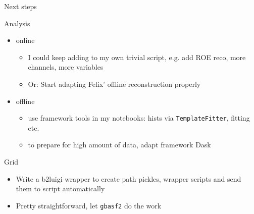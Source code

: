 \documentclass[aspectratio=169, 16pt]{beamer}
\begin{document}
\begin{frame}[label={sec:org5885a38},fragile]{Next steps}
 \begin{block}{Analysis}
\begin{itemize}
\item online
\begin{itemize}
\item I could keep adding to my own trivial script, e.g. add ROE reco, more
channels, more variables
\item Or: Start adapting Felix' offline reconstruction properly
\end{itemize}
\item offline
\begin{itemize}
\item use framework tools in my notebooks: hists via \texttt{TemplateFitter}, fitting etc.
\item to prepare for high amount of data, adapt framework Dask
\end{itemize}
\end{itemize}
\end{block}
\begin{block}{Grid}
\begin{itemize}
\item Write a b2luigi wrapper to create path pickles, wrapper scripts and send them
to script automatically
\item Pretty straightforward, let \texttt{gbasf2} do the work
\end{itemize}
\end{block}
\end{frame}
\end{document}
